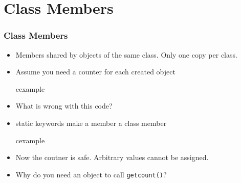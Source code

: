 \section{Class Members}
\begin{frame}
\frametitle{Class Members}
\begin{itemize}
\item Members shared by objects of the same class. Only one copy per class.
\item Assume you need a counter for each created object
\begin{beamercolorbox}{cexample}
\codeclassmemone
\end{beamercolorbox}
\item What is wrong with this code? 
\end{itemize}
\end{frame}

\begin{frame}
\begin{itemize}
\item \alert{static} keywords make a member a class member
\begin{beamercolorbox}{cexample}
\codeclassmemtwo
\end{beamercolorbox}
\item Now the coutner is safe. Arbitrary values cannot be assigned.
\item Why do you need an object to call \lstinline!getcount()!?
\end{itemize}
\end{frame}

